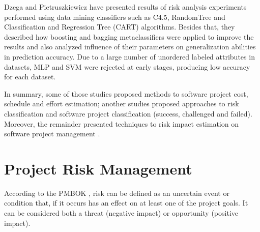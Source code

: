 Dzega and Pietruszkiewicz \cite{dzega2010classification} have presented results of risk analysis experiments performed using data mining classifiers such as C4.5, RandomTree and Classification and Regression Tree (CART) algorithms. Besides that, they described how boosting and bagging metaclassifiers were applied to improve the results and also analyzed influence of their parameters on generalization abilities in prediction accuracy. Due to a large number of unordered labeled attributes in datasets, MLP and SVM were rejected at early stages, producing low accuracy for each dataset.

In summary, some of those studies proposed methods to software project cost, schedule and effort estimation; another studies proposed approaches to risk classification and software project classification (success, challenged and failed). Moreover, the remainder presented techniques to risk impact estimation on software project management \cite{yu2011software} \cite{saxena2012software} \cite{lazzerini2011analyzing} \cite{dzega2010classification}.

\section{Project Risk Management}

According to the PMBOK \cite{PMBOK2008}, risk can be defined as an uncertain event or condition that, if it occurs has an effect on at least one of the project goals. It can be considered both a threat (negative impact) or opportunity (positive impact).

